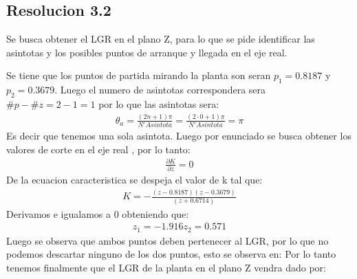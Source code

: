 \documentclass[
  11pt,
  letterpaper,
   addpoints,
  ]{exam}
\begin{document}
\begin{questions}
\begin{solution}
\subsection*{Resolucion 3.2}
Se busca obtener el LGR en el plano Z, para lo que se pide identificar las asintotas y los posibles puntos de arranque y llegada en el eje real.

Se tiene que los puntos de partida mirando la planta son seran $p_{1} = 0.8187$ y $p_{2} = 0.3679$. Luego el numero de asintotas correspondera sera $\#p - \#z = 2-1 =1 $ por lo que las asintotas sera:
\begin{align}
    \theta_{a} = \frac{(2n+1)\pi}{N^{\circ} Asintota} = \frac{(2\cdot 0 +1)\pi}{N^{\circ} Asintota} = \pi
\end{align}
Es decir que tenemos una sola asintota. Luego por enunciado se busca obtener los valores de corte en el eje real , por lo tanto:
\begin{align}
    \frac{\partial K}{\partial z} = 0
\end{align} 
De la ecuacion caracteristica se despeja el valor de k tal que:
\begin{align}
    K=  -\frac{(z-0.8187)(z-0.3679)}{(z+0.6714)}
\end{align}
Derivamos e igualamos a 0 obteniendo que:
\begin{align}
    z_{1} = -1.916
    z_{2} = 0.571
\end{align}
Luego se observa que ambos puntos deben pertenecer al LGR, por lo que no podemos descartar ninguno de los dos puntos, esto se observa en:
Por lo tanto tenemos finalmente que el LGR de la planta en el plano Z vendra dado por:

\end{solution}
\end{questions}
\end{document}
